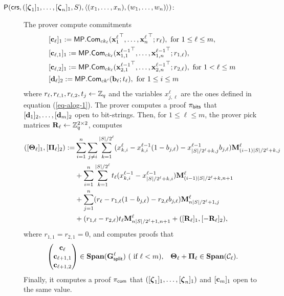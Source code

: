 \begin{description}
\item[{$\mathsf{P}(\mathsf{crs}, ([{\boldsymbol \zeta}_1]_1, \ldots, [{\boldsymbol \zeta}_n]_1,S), \langle (x_1,\ldots,x_n),(w_1,\ldots,w_n) \rangle)$}:]
The prover compute commitments
\begin{align*}
&[\mathbf{c}_\ell]_1:=\mathsf{MP}.\mathsf{Com}_{ck_\ell}({\mathbf{x}^\ell_1}^\top,\ldots,{\mathbf{x}^\ell_n}^\top;r_\ell), \text{ for }1\leq \ell \leq m,\\
&[\mathbf{c}_{\ell,1}]_1:=\mathsf{MP}.\mathsf{Com}_{ck_\ell}({\mathbf{x}^{\ell-1}_{1,1}}^\top,\ldots,{\mathbf{x}^{\ell-1}_{1,n}}^\top;r_{1,\ell}),\\
&[\mathbf{c}_{\ell,2}]_1:=\mathsf{MP}.\mathsf{Com}_{ck_\ell}({\mathbf{x}^{\ell-1}_{2,1}}^\top,\ldots,{\mathbf{x}^{\ell-1}_{2,n}}^\top;r_{2,\ell}), \text{ for } 1<\ell\leq m\\
&[\mathbf{d}_\ell]_2:=\mathsf{MP}.\mathsf{Com}_{ck'}(\mathbf{b}_\ell;t_\ell),\text{ for } 1\leq i\leq m
\end{align*}
 where $r_\ell,r_{\ell,1},r_{\ell,2},t_j\gets\mathbb{Z}_q$ and the variables $x^\ell_{j,\ell}$ are the ones defined in equation (\ref{eq-alog-1}). The prover computes a proof $\pi_{\mathsf{bits}}$ that $[\mathbf{d}_1]_2,\ldots,[\mathbf{d}_m]_2$ open to bit-strings. Then, for $1\leq\ell\leq m$, the prover pick matrices $\mathbf{{R}}_\ell\gets\mathbb{Z}_q^{2\times 2}$, computes
\begin{align*}
([\mathbf{{\Theta}}_\ell]_1,[\mathbf{{\Pi}}_\ell]_2)  := & \sum_{i=1}^n\sum_{j\neq i}\sum_{k=1}^{|S|/2^\ell}(x^\ell_{k,i}-x^{\ell-1}_{k,i}(1-b_{j,\ell})-x^{\ell-1}_{|S|/2^\ell+k,j}b_{j,\ell})\mathbf{{M}}_{(i-1)|S|/2^\ell+k,j}^\ell\\
&+ \sum_{i=1}^n\sum_{k=1}^{|S|/2^\ell}t_\ell(x^{\ell-1}_{k,i}-x^{\ell-1}_{|S|/2^{\ell}+k,i})\mathbf{{M}}_{(i-1)|S|/2^\ell+k,n+1}^\ell \\
&+ \sum_{j=1}^n (r_\ell-r_{1,\ell}(1-b_{j,\ell})-r_{2,\ell}b_{j,\ell})\mathbf{{M}}_{n|S|/2^\ell+1,j}^\ell \\
&+(r_{1,\ell}-r_{2,\ell})t_\ell\mathbf{{M}}^\ell_{n|S|/2^\ell+1,n+1}+([\mathbf{{R}}_\ell]_1,[-\mathbf{{R}}_\ell]_2),
\end{align*}
where $r_{1,1}=r_{2,1}=0$, and computes proofs that
\begin{align*}
&\begin{pmatrix}
\mathbf{c}_{\ell}\\\mathbf{c}_{\ell+1,1}\\\mathbf{c}_{\ell+1,2}
\end{pmatrix}\in
\mathbf{Span}(\mathbf{{G}}^{\ell}_\mathsf{split})\ (\text{ if }\ell< m), &\mathbf{{\Theta_\ell}}+\mathbf{{\Pi_\ell}}\in\mathbf{Span}(\mathcal{C}_\ell).
\end{align*}
Finally, it computes a proof $\pi_{\mathsf{com}}$ that $([{\boldsymbol \zeta}_1]_1,\ldots,[{\boldsymbol \zeta}_n]_1)$ and $[\mathbf{c}_m]_1$ open to the same value.


\end{description}
